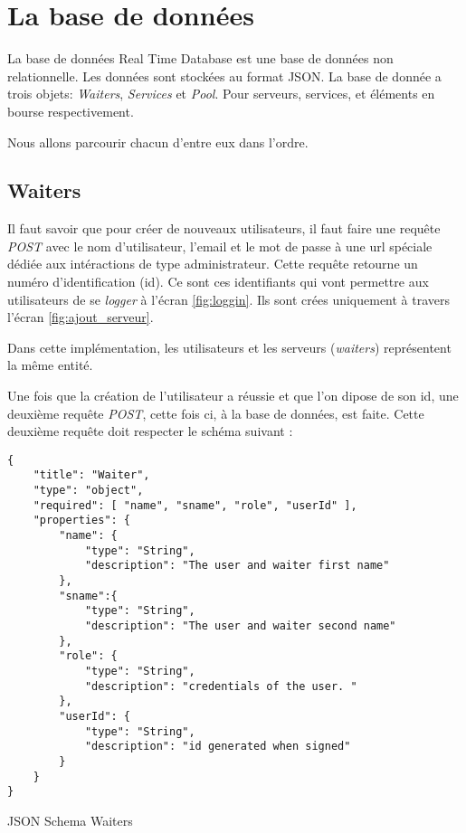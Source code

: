 \section{La base de données}
La base de données Real Time Database est une base de données non relationnelle. Les données sont stockées au format JSON. La base de donnée a trois objets: \textit{Waiters}, \textit{Services} et \textit{Pool}. Pour serveurs, services, et éléments en bourse respectivement.

Nous allons parcourir chacun d'entre eux dans l'ordre.

\subsection*{Waiters}
Il faut savoir que pour créer de nouveaux utilisateurs, il faut faire une requête \textit{POST} avec le nom d'utilisateur, l'email et le mot de passe à une url spéciale dédiée aux intéractions de type administrateur. Cette requête retourne un numéro d'identification (id). Ce sont ces identifiants qui vont permettre aux utilisateurs de se \textit{logger} à l'écran \ref{fig:loggin}. Ils sont crées uniquement à travers l'écran \ref{fig:ajout_serveur}.

Dans cette implémentation, les utilisateurs et les serveurs (\textit{waiters}) représentent la même entité.

Une fois que la création de l'utilisateur a réussie et que l'on dipose de son id, une deuxième requête \textit{POST}, cette fois ci, à la base de données, est faite. Cette deuxième requête doit respecter le schéma suivant : 

\begin{listing}[!h]
\begin{verbatim}
{
    "title": "Waiter",
    "type": "object",
    "required": [ "name", "sname", "role", "userId" ],
    "properties": {
        "name": {
            "type": "String",
            "description": "The user and waiter first name"
        },
        "sname":{
            "type": "String",
            "description": "The user and waiter second name"
        },
        "role": {
            "type": "String",
            "description": "credentials of the user. "
        },
        "userId": {
            "type": "String",
            "description": "id generated when signed"
        }   
    }
}
\end{verbatim}
\caption{JSON Schema Waiters}
\label{schema:waiters}
\end{listing}


